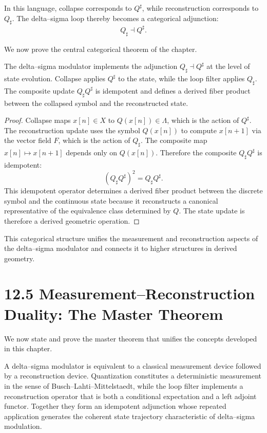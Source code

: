 In this language, collapse corresponds to $Q^{\sharp}$, while reconstruction corresponds to $Q_{\sharp}$. The delta--sigma loop thereby becomes a categorical adjunction:
\[
Q_{\sharp} \dashv Q^{\sharp}.
\]

We now prove the central categorical theorem of the chapter.

\begin{theorem}
The delta--sigma modulator implements the adjunction $Q_{\sharp} \dashv Q^{\sharp}$ at the level of state evolution. Collapse applies $Q^{\sharp}$ to the state, while the loop filter applies $Q_{\sharp}$. The composite update $Q_{\sharp} Q^{\sharp}$ is idempotent and defines a derived fiber product between the collapsed symbol and the reconstructed state.
\end{theorem}

\begin{proof}
Collapse maps $x[n] \in X$ to $Q(x[n]) \in \Lambda$, which is the action of $Q^{\sharp}$. The reconstruction update uses the symbol $Q(x[n])$ to compute $x[n+1]$ via the vector field $F$, which is the action of $Q_{\sharp}$. The composite map $x[n] \mapsto x[n+1]$ depends only on $Q(x[n])$. Therefore the composite $Q_{\sharp}Q^{\sharp}$ is idempotent:
\[
(Q_{\sharp}Q^{\sharp})^{2} = Q_{\sharp}Q^{\sharp}.
\]
This idempotent operator determines a derived fiber product between the discrete symbol and the continuous state because it reconstructs a canonical representative of the equivalence class determined by $Q$. The state update is therefore a derived geometric operation.
\end{proof}

This categorical structure unifies the measurement and reconstruction aspects of the delta--sigma modulator and connects it to higher structures in derived geometry.

\section*{12.5 Measurement--Reconstruction Duality: The Master Theorem}

We now state and prove the master theorem that unifies the concepts developed in this chapter.

\begin{theorem}
A delta--sigma modulator is equivalent to a classical measurement device followed by a reconstruction device. Quantization constitutes a deterministic measurement in the sense of Busch--Lahti--Mittelstaedt, while the loop filter implements a reconstruction operator that is both a conditional expectation and a left adjoint functor. Together they form an idempotent adjunction whose repeated application generates the coherent state trajectory characteristic of delta--sigma modulation.
\end{theorem}

